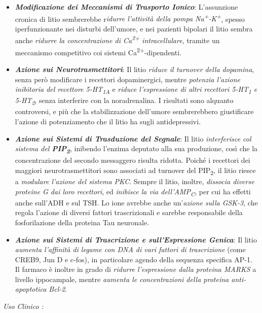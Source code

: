 \documentclass[]{article}
\begin{document}
\begin{itemize}
\item
  \textbf{\emph{Modificazione dei Meccanismi di Trasporto Ionico}}:
  L'assunzione cronica di litio sembrerebbe r\emph{idurre l'attività
  della pompa Na\textsuperscript{+}-K\textsuperscript{+}}, spesso
  iperfunzionante nei disturbi dell'umore, e nei pazienti bipolari il
  litio sembra anche \emph{ridurre la concentrazione di
  Ca\textsuperscript{2+} intracellulare}, tramite un meccanismo
  competitivo coi sistemi Ca\textsuperscript{2+}-dipendenti.
\item
  \textbf{\emph{Azione sui Neurotrasmettitori}}: Il litio \emph{riduce
  il turnover della dopamina}, senza però modificare i recettori
  dopaminergici, mentre \emph{potenzia l'azione inibitoria del recettore
  5-HT\textsubscript{1A}} e \emph{riduce l'espressione di altri
  recettori 5-HT\textsubscript{1} e 5-HT\textsubscript{2}}, senza
  interferire con la noradrenalina. I risultati sono alquanto
  controversi, e più che la stabilizzazione dell'umore sembrerebbero
  giustificare l'azione di potenziamento che il litio ha sugli
  antidepressivi.
\item
  \textbf{\emph{Azione sui Sistemi di Trasduzione del Segnale}}: Il
  litio \emph{interferisce col sistema del
  \textbf{PIP\textsubscript{2}}}, inibendo l'enzima deputato alla sua
  produzione, così che la concentrazione del secondo messaggero risulta
  ridotta. Poiché i recettori dei maggiori neurotrasmettitori sono
  associati ad turnover del PIP\textsubscript{2}, il litio riesce a
  \emph{modulare l'azione del sistema PKC}. Sempre il litio, inoltre,
  \emph{dissocia diverse proteine G dai loro recettori}, ed
  \emph{inibisce la via dell'AMP\textsubscript{C}}, per cui ha effetti
  anche sull'ADH e sul TSH. Lo ione avrebbe anche un'\emph{azione sulla
  GSK-3}, che regola l'azione di diversi fattori trascrizionali e
  sarebbe responsabile della fosforilazione della proteina Tau
  neuronale.
\item
  \textbf{\emph{Azione sui Sistemi di Trascrizione e sull'Espressione
  Genica}}: Il litio \emph{aumenta l'affinità di legame con DNA di vari
  fattori di trascrizione} (come CREB9, Jun D e c-fos), in particolare
  agendo della sequenza specifica AP-1. Il farmaco è inoltre in grado di
  \emph{ridurre l'espressione dalla proteina MARKS} a livello
  ippocampale, mentre \emph{aumenta le concentrazioni della proteina
  anti-apoptotica Bcl-2}.
\end{itemize}

\emph{\emph{Uso Clinico :}}
\end{document}
